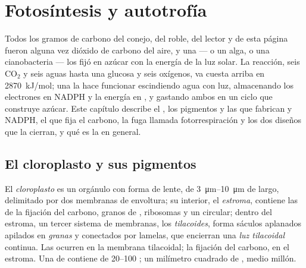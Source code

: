 \chapter{Fotosíntesis y autotrofía}\label{ch:b1:photosynthesis}

Todos los gramos de carbono del conejo, del roble, del lector y de esta
página fueron alguna vez dióxido de carbono del aire, y una  --- o un
alga, o una cianobacteria --- los fijó en azúcar con la energía de la luz
solar. La reacción, seis $\mathrm{CO_2}$ y seis aguas hasta una glucosa y
seis oxígenos, va cuesta arriba en \qty{2870}{kJ/mol}; una  la hace
funcionar escindiendo agua con luz, almacenando los electrones en NADPH y la
energía en , y gastando ambos en un ciclo que construye azúcar. Este
capítulo describe el , los pigmentos y las 
que fabrican  y NADPH, el  que fija el carbono, la fuga
llamada fotorrespiración y los dos diseños que la cierran, y qué es la
 en general.

\section{El cloroplasto y sus pigmentos}

\begin{definition}[Cloroplasto]\label{def:b1:photosynthesis:chloroplast}
El \emph{cloroplasto} es un orgánulo con forma de lente,
de \qtyrange{3}{10}{\micro m} de largo, delimitado por dos membranas de
envoltura; su interior, el \emph{estroma}, contiene las
 de la fijación del carbono, granos de , ribosomas y un 
circular; dentro del estroma, un tercer sistema de membranas, los
\emph{tilacoides}, forma sáculos aplanados apilados en
\emph{granas} y conectados por lamelas, que encierran una \emph{luz
tilacoidal} continua. Las  ocurren en la membrana
tilacoidal; la fijación del carbono, en el estroma. Una  de 
contiene de \qtyrange{20}{100}{} ; un milímetro cuadrado de
, medio millón.
\end{definition}

